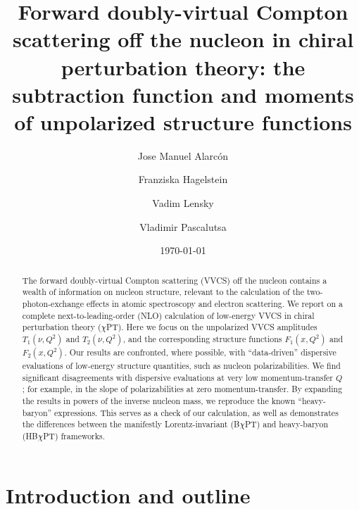 \documentclass[12pt,preprint,tightenlines,
showpacs,preprintnumbers,amsmath,amssymb,
a4paper,nofootinbib]{revtex4-2}
\begin{document}
\title {Forward doubly-virtual 
Compton scattering off the nucleon in chiral perturbation theory:
the subtraction function and moments of unpolarized structure functions}
\author{Jose Manuel Alarc\'on}
\author{Franziska Hagelstein}
\author{Vadim Lensky}
\author{Vladimir Pascalutsa}
\begin{abstract}
The forward doubly-virtual 
Compton scattering (VVCS) off the nucleon contains a wealth of information on nucleon structure, relevant to the calculation
of the two-photon-exchange effects in atomic spectroscopy and electron scattering. We report on a complete next-to-leading-order (NLO)
calculation of low-energy VVCS in chiral perturbation
theory ($\chi$PT). 
Here we focus on the unpolarized VVCS amplitudes $T_1(\nu, Q^2)$
and $T_2(\nu, Q^2)$, and the corresponding structure functions
$F_1(x, Q^2)$ and $F_2(x,Q^2)$. Our results are confronted, where possible, with ``data-driven'' dispersive evaluations of 
low-energy structure 
quantities, such as nucleon polarizabilities.  We find  significant disagreements with dispersive evaluations at very
low momentum-transfer $Q$; for example,
in the slope of polarizabilities at zero momentum-transfer. 
By expanding the results in powers of the inverse nucleon  mass, we reproduce the known ``heavy-baryon'' expressions. This serves as a check of our calculation, as well as  demonstrates the differences between the manifestly Lorentz-invariant (B$\chi$PT)
and heavy-baryon (HB$\chi$PT) frameworks. 
\end{abstract}
\pacs{}
\date{\today}
\maketitle
\newpage

\tableofcontents

\newpage
\section{Introduction and outline}
\end{document}
